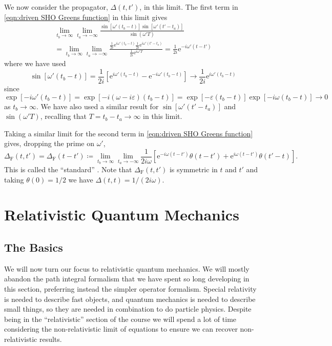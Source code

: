 \documentclass[fleqn]{NotesClass}
\newcommand*{\e}{\mathrm{e}}
\begin{document}
    We now consider the propagator, \(\Delta(t, t')\), in this limit.
    The first term in \cref{eqn:driven SHO Greens function} in this limit gives
    \begin{multline}
        \lim_{t_b \to \infty} \lim_{t_a \to -\infty} \frac{\sin[\omega'(t_b - t)]\sin[\omega'(t' - t_a)]}{\sin(\omega' T)}\\
        = \lim_{t_b \to \infty} \lim_{t_a \to -\infty} \frac{\frac{1}{2i}\e^{i\omega'(t_b - t)} \frac{1}{2i}\e^{i\omega'(t' - t_a)}}{\frac{1}{2i}\e^{i\omega'T}} = \frac{1}{2i} \e^{-i\omega'(t - t')}
    \end{multline}
    where we have used
    \begin{equation}
        \sin[\omega'(t_b - t)] = \frac{1}{2i}[\e^{i\omega'(t_b - t)} - \e^{-i\omega'(t_b - t)}] \to \frac{1}{2i}\e^{i\omega'(t_b - t)}
    \end{equation}
    since 
    \begin{equation}
        \exp[-i\omega'(t_b - t)] = \exp[-i(\omega - i\varepsilon)(t_b - t)] = \exp[-\varepsilon(t_b - t)]\exp[-i\omega(t_b - t)] \to 0
    \end{equation}
    as \(t_b \to \infty\).
    We have also used a similar result for \(\sin[\omega'(t' - t_a)]\) and \(\sin(\omega' T)\), recalling that \(T = t_b - t_a \to \infty\) in this limit.
    
    Taking a similar limit for the second term in \cref{eqn:driven SHO Greens function} gives, dropping the prime on \(\omega'\),
    \begin{equation}
        \Delta_{\mathrm{F}}(t, t') = \Delta_{\mathrm{F}}(t - t') \coloneqq \lim_{t_b\to\infty} \lim_{t_a \to -\infty} \frac{1}{2i\omega} [\e^{-i\omega(t - t')}\theta(t - t') + \e^{i\omega(t - t')}\theta(t' - t)].
    \end{equation}
    This is called the \enquote{standard} .
    Note that \(\Delta_{\mathrm{F}}(t, t')\) is symmetric in \(t\) and \(t'\) and taking \(\theta(0) = 1/2\) we have \(\Delta(t, t) = 1/(2i\omega)\).
    
    \part{Relativistic Quantum Mechanics}
    \chapter{The Basics}
    We will now turn our focus to relativistic quantum mechanics.
    We will mostly abandon the path integral formalism that we have spent so long developing in this section, preferring instead the simpler operator formalism.
    Special relativity is needed to describe fast objects, and quantum mechanics is needed to describe small things, so they are needed in combination to do particle physics.
    Despite being in the \enquote{relativistic} section of the course we will spend a lot of time considering the non-relativistic limit of equations to ensure we can recover non-relativistic results.
    
\end{document}
